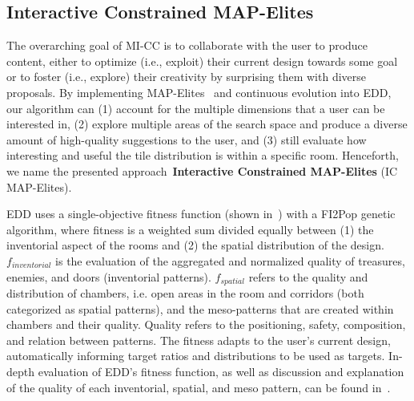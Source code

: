 \subsection{Interactive Constrained MAP-Elites} \label{section:3}

The overarching goal of MI-CC is to collaborate with the user to produce content, either to optimize (i.e., exploit) their current design towards some goal or to foster (i.e., explore) their creativity by surprising them with diverse proposals. By implementing MAP-Elites~\cite{p6Mouret2015} and continuous evolution into EDD, our algorithm can (1) account for the multiple dimensions that a user can be interested in, (2) explore multiple areas of the search space and produce a diverse amount of high-quality suggestions to the user, and (3) still evaluate how interesting and useful the tile distribution is within a specific room. Henceforth, we name the presented approach~\textbf{Interactive Constrained MAP-Elites} (IC MAP-Elites).

EDD uses a single-objective fitness function (shown in~) with a FI2Pop genetic algorithm, where fitness is a weighted sum divided equally between (1) the inventorial aspect of the rooms and (2) the spatial distribution of the design. $f_{inventorial}$ is the evaluation of the aggregated and normalized quality of treasures, enemies, and doors (inventorial patterns). $f_{spatial}$ refers to the quality and distribution of chambers, i.e. open areas in the room and corridors (both categorized as spatial patterns), and the meso-patterns that are created within chambers and their quality. Quality refers to the positioning, safety, composition, and relation between patterns. The fitness adapts to the user's current design, automatically informing target ratios and distributions to be used as targets. In-depth evaluation of EDD's fitness function, as well as discussion and explanation of the quality of each inventorial, spatial, and meso pattern, can be found in~\cite{p6Alvarez2018a,Baldwin2017,Baldwin2017a}.


